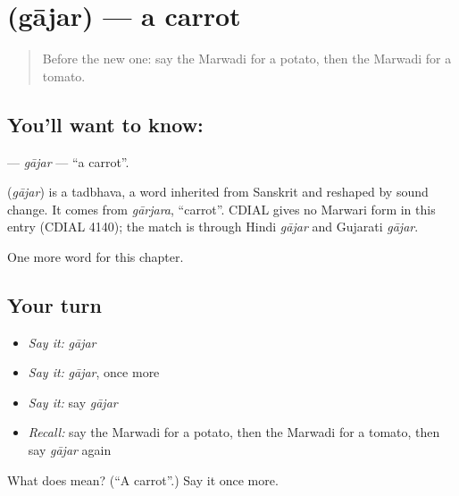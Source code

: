 \section[\texorpdfstring{\mw{गाजर} (gājar)}{गाजर (gājar)}]{ (gājar) — a carrot}

\label{lesson:MW-C59-gajar}



\begin{quote}
Before the new one: say the Marwadi for a potato, then the Marwadi for a tomato.
\end{quote}

\subsection*{You'll want to know: }
\textbf{} — \emph{gājar} — \textquotedblleft{}a carrot\textquotedblright{}.

\begin{cousinweb}
\textbf{} (\emph{gājar}) is a tadbhava, a word inherited from Sanskrit and reshaped by sound change. It comes from \emph{gārjara}, \textquotedblleft{}carrot\textquotedblright{}. CDIAL gives no Marwari form in this entry (CDIAL 4140); the match is through Hindi \emph{gājar} and Gujarati \emph{gājar}.
\end{cousinweb}

\begin{grammarlens}[title={What you've built}]
One more word for this chapter.
\end{grammarlens}

\subsection*{Your turn}
\begin{itemize}
\raggedright
  \item \emph{Say it:} \emph{gājar}
  \item \emph{Say it:} \emph{gājar}, once more
  \item \emph{Say it:} say \emph{gājar}
  \item \emph{Recall:} say the Marwadi for a potato, then the Marwadi for a tomato, then say \emph{gājar} again
\end{itemize}

\begin{tcolorbox}[breakable,colback=teal!4,colframe=teal!35!black,title={Before you move on}]
What does  mean? (\textquotedblleft{}A carrot\textquotedblright{}.) Say it once more.
\end{tcolorbox}
